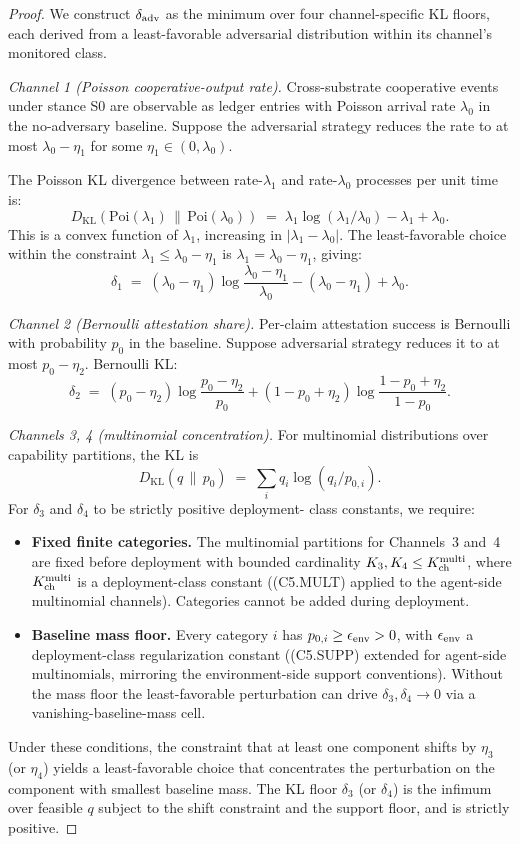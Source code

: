 \begin{proof}
We construct $\delta_{\mathrm{adv}}$ as the minimum over four channel-specific
KL floors, each derived from a least-favorable adversarial
distribution within its channel's monitored class.

\emph{Channel 1 (Poisson cooperative-output rate).}
Cross-substrate cooperative events under stance S0 are observable as
ledger entries with Poisson arrival rate $\lambda_0$ in the
no-adversary baseline. Suppose the adversarial strategy reduces the
rate to at most $\lambda_0 - \eta_1$ for some
$\eta_1 \in (0, \lambda_0)$.

The Poisson KL divergence between rate-$\lambda_1$ and rate-$\lambda_0$
processes per unit time is:
\[
  D_{\mathrm{KL}}(\mathrm{Poi}(\lambda_1) \,\|\, \mathrm{Poi}(\lambda_0))
  \;=\; \lambda_1 \log(\lambda_1 / \lambda_0) - \lambda_1 + \lambda_0.
\]
This is a convex function of $\lambda_1$, increasing in
$|\lambda_1 - \lambda_0|$. The least-favorable choice within the
constraint $\lambda_1 \leq \lambda_0 - \eta_1$ is $\lambda_1 =
\lambda_0 - \eta_1$, giving:
\[
  \delta_1 \;=\; (\lambda_0 - \eta_1) \log\!\frac{\lambda_0 - \eta_1}
  {\lambda_0} - (\lambda_0 - \eta_1) + \lambda_0.
\]

\emph{Channel 2 (Bernoulli attestation share).}
Per-claim attestation success is Bernoulli with probability $p_0$
in the baseline. Suppose adversarial strategy reduces it to at most
$p_0 - \eta_2$. Bernoulli KL:
\[
  \delta_2 \;=\; (p_0 - \eta_2) \log\!\frac{p_0 - \eta_2}{p_0} +
  (1 - p_0 + \eta_2) \log\!\frac{1 - p_0 + \eta_2}{1 - p_0}.
\]

\emph{Channels 3, 4 (multinomial concentration).}
For multinomial distributions over capability partitions, the KL
is
\[
  D_{\mathrm{KL}}(q \,\|\, p_0) \;=\; \sum_i q_i \log(q_i / p_{0,i}).
\]
For $\delta_3$ and $\delta_4$ to be strictly positive deployment-
class constants, we require:
\begin{itemize}
\item \textbf{Fixed finite categories.}  The multinomial partitions
  for Channels~3 and~4 are fixed before deployment with bounded
  cardinality $K_3, K_4 \leq K_{\mathrm{ch}}^{\mathrm{multi}}$, where
  $K_{\mathrm{ch}}^{\mathrm{multi}}$ is a deployment-class constant ((C5.MULT)
  applied to the agent-side multinomial channels).  Categories
  cannot be added during deployment.
\item \textbf{Baseline mass floor.}  Every category $i$ has
  $p_{0,i} \geq \epsilon_{\mathrm{env}} > 0$, with $\epsilon_{\mathrm{env}}$ a deployment-class
  regularization constant ((C5.SUPP) extended for agent-side
  multinomials, mirroring the environment-side support
  conventions).  Without the mass floor the least-favorable
  perturbation can drive $\delta_3, \delta_4 \to 0$ via a
  vanishing-baseline-mass cell.
\end{itemize}
Under these conditions, the constraint that at least one component
shifts by $\eta_3$ (or $\eta_4$) yields a least-favorable choice
that concentrates the perturbation on the component with smallest
baseline mass.  The KL floor $\delta_3$ (or $\delta_4$) is the
infimum over feasible $q$ subject to the shift constraint and the
support floor, and is strictly positive.


\end{proof}
